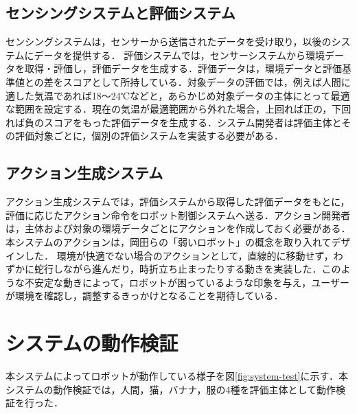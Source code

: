 \documentclass[paper=a4paper,jafontsize=9pt,head_space=15mm,gutter=20mm,
twocolumn,number_of_lines=49, line_length=26zw]{myuarticle}
\begin{document}
\subsection{センシングシステムと評価システム}
センシングシステムは，センサーから送信されたデータを受け取り，以後のシステムにデータを提供する．
評価システムでは，センサーシステムから環境データを取得・評価し，評価データを生成する．評価データは，環境データと評価基準値との差をスコアとして所持している．対象データの評価では，例えば人間に適した気温であれば18～24℃などと，あらかじめ対象データの主体にとって最適な範囲を設定する．現在の気温が最適範囲から外れた場合，上回れば正の，下回れば負のスコアをもった評価データを生成する．システム開発者は評価主体とその評価対象ごとに，個別の評価システムを実装する必要がある．

\subsection{アクション生成システム}
アクション生成システムでは，評価システムから取得した評価データをもとに，評価に応じたアクション命令をロボット制御システムへ送る．アクション開発者は，主体および対象の環境データごとにアクションを作成しておく必要がある．本システムのアクションは，岡田ら\cite{岡田-2017-弱いロボ}の「弱いロボット」の概念を取り入れてデザインした．
環境が快適でない場合のアクションとして，直線的に移動せず，わずかに蛇行しながら進んだり，時折立ち止まったりする動きを実装した．このような不安定な動きによって，ロボットが困っているような印象を与え，ユーザーが環境を確認し，調整するきっかけとなることを期待している．



\section{システムの動作検証}
本システムによってロボットが動作している様子を図\ref{fig:system-test}に示す．本システムの動作検証では，人間，猫，バナナ，服の4種を評価主体として動作検証を行った．
\end{document}
